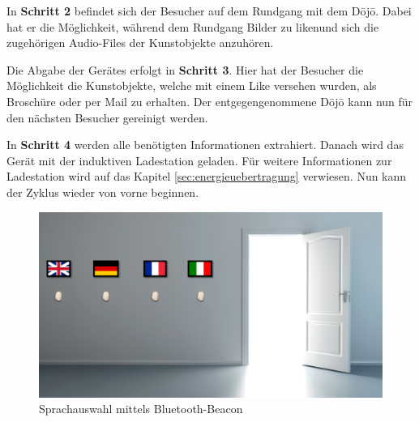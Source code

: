 In \textbf{Schritt 2} befindet sich der Besucher auf dem Rundgang mit dem Dōjō. Dabei hat er die Möglichkeit, während dem Rundgang Bilder zu \glqq liken\grqq und sich die zugehörigen Audio-Files der Kunstobjekte anzuhören.

Die Abgabe der Gerätes erfolgt in \textbf{Schritt 3}. Hier hat der Besucher die Möglichkeit die Kunstobjekte, welche mit einem {\glqq Like\grqq} versehen wurden, als Broschüre oder per Mail zu erhalten. Der entgegengenommene Dōjō kann nun für den nächsten Besucher gereinigt werden.

In \textbf{Schritt 4} werden alle benötigten Informationen extrahiert. Danach wird das Gerät mit der induktiven Ladestation geladen. Für weitere Informationen zur Ladestation wird auf das Kapitel \ref{sec:energieuebertragung} verwiesen. Nun kann der Zyklus wieder von vorne beginnen.
\begin{figure}[H]
	\begin{center}
		\includegraphics[width=140mm]{data/BeaconSpracherkennung.png}
		\caption[Sprachauswahl mittels Bluetooth-Beacon]{Sprachauswahl mittels Bluetooth-Beacon} %
		\label{fig:SprachauswahlBeacon}
	\end{center}
\end{figure}